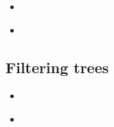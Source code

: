 \documentclass[compress, ucs, xelatex, 11pt, xcolor=x11names, aspectratio=1609,
	hyperref={
		bookmarks=true,
		unicode=true,
		colorlinks=true,
		pdftitle={HybSeq course},
		plainpages=false,
		pdfauthor={Vojtech Zeisek},
		pdfsubject={Practical processing of HybSeq target enrichment sequencing data on computing grids like MetaCentrum},
		pdfcreator={XeLaTeX},
		pdfkeywords={BASH, command line, GNU, HybSeq, Linux, MetaCentrum, sequencing shell, target enrichment},
		linkcolor=Cyan2, %
		anchorcolor=Firebrick2, %
		citecolor=Firebrick2, %
		filecolor=Firebrick2, %
		menucolor=Firebrick2, %
		urlcolor=Chartreuse2, %
		pdftex},
	url={hyphens, lowtilde} %
	]{beamer}
\begin{document}
\begin{frame}[fragile]{}
	\begin{itemize}
		\item 
	\end{itemize}
	\begin{spluscode}
    
	\end{spluscode}
	\begin{bashcode}
    
	\end{bashcode}
\end{frame}

\begin{frame}[fragile]{}
	\begin{itemize}
		\item 
	\end{itemize}
	\begin{spluscode}
    
	\end{spluscode}
	\begin{bashcode}
    
	\end{bashcode}
\end{frame}

\subsection{Filtering trees}

\begin{frame}[fragile]{}
	\begin{itemize}
		\item 
	\end{itemize}
	\begin{spluscode}
    
	\end{spluscode}
	\begin{bashcode}
    
	\end{bashcode}
\end{frame}

\begin{frame}[fragile]{}
	\begin{itemize}
		\item 
	\end{itemize}
	\begin{spluscode}
    
	\end{spluscode}
	\begin{bashcode}
    
	\end{bashcode}
\end{frame}
\end{document}
